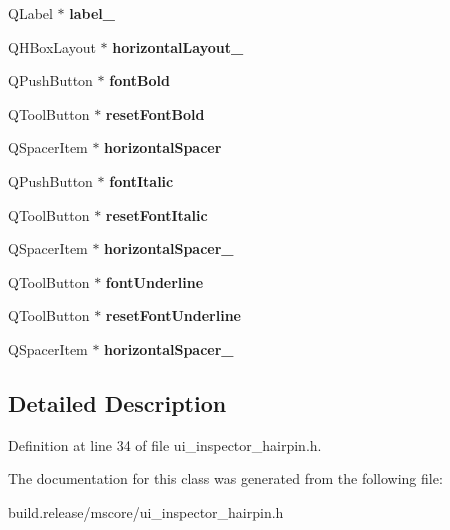 \begin{DoxyCompactItemize}
Q\+Label $\ast$ {\bfseries label\+\_}
\item 
\mbox{\label{class_ui___inspector_hairpin_ab739a39a8b672b6778a598d200023288}} 
Q\+H\+Box\+Layout $\ast$ {\bfseries horizontal\+Layout\+\_}
\item 
\mbox{\label{class_ui___inspector_hairpin_ae2ce450c35bc0e377e8d7985f9988eb4}} 
Q\+Push\+Button $\ast$ {\bfseries font\+Bold}
\item 
\mbox{\label{class_ui___inspector_hairpin_a69e9a1274a5ef9b3f26a6e7c38a2c38c}} 
Q\+Tool\+Button $\ast$ {\bfseries reset\+Font\+Bold}
\item 
\mbox{\label{class_ui___inspector_hairpin_a0ca6cbd936aaa492dbccfdb5ee841de2}} 
Q\+Spacer\+Item $\ast$ {\bfseries horizontal\+Spacer}
\item 
\mbox{\label{class_ui___inspector_hairpin_a067d04aaba3420993540975009261681}} 
Q\+Push\+Button $\ast$ {\bfseries font\+Italic}
\item 
\mbox{\label{class_ui___inspector_hairpin_a2e4119d9c32f2a051ba7b4f33b59c6ff}} 
Q\+Tool\+Button $\ast$ {\bfseries reset\+Font\+Italic}
\item 
\mbox{\label{class_ui___inspector_hairpin_ac404026f83375450741bd04ccc2bf5fb}} 
Q\+Spacer\+Item $\ast$ {\bfseries horizontal\+Spacer\+\_}
\item 
\mbox{\label{class_ui___inspector_hairpin_a649acf1687628a1ca03836c30461c278}} 
Q\+Tool\+Button $\ast$ {\bfseries font\+Underline}
\item 
\mbox{\label{class_ui___inspector_hairpin_aeb1734453880b6d516768887b3d01240}} 
Q\+Tool\+Button $\ast$ {\bfseries reset\+Font\+Underline}
\item 
\mbox{\label{class_ui___inspector_hairpin_ae3c1f15f0202e94d65c153fd8288c524}} 
Q\+Spacer\+Item $\ast$ {\bfseries horizontal\+Spacer\+\_}
\end{DoxyCompactItemize}


\subsection{Detailed Description}


Definition at line 34 of file ui\+\_\+inspector\+\_\+hairpin.\+h.



The documentation for this class was generated from the following file\+:\begin{DoxyCompactItemize}
\item 
build.\+release/mscore/ui\+\_\+inspector\+\_\+hairpin.\+h\end{DoxyCompactItemize}
